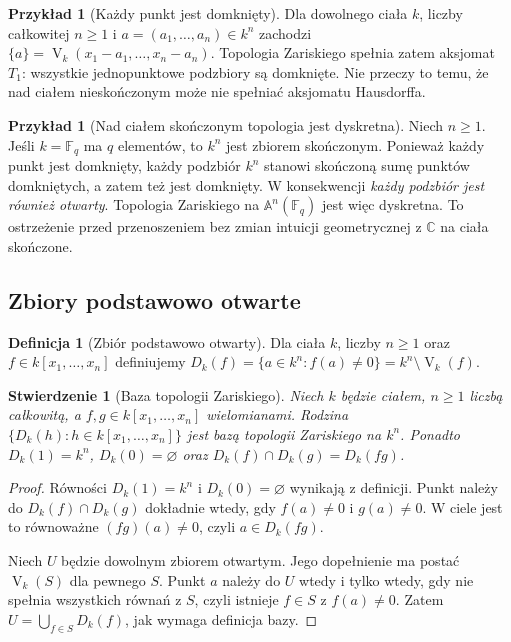 \documentclass[11pt,a4paper,openany]{report}
\numberwithin{equation}{section}
\theoremstyle{plain}
\newtheorem{stwierdzenie}[twierdzenie]{Stwierdzenie}
\theoremstyle{definition}
\newtheorem{definicja}[twierdzenie]{Definicja}
\newtheorem{przyklad}[twierdzenie]{Przykład}
\theoremstyle{remark}
\newcommand{\C}{\mathbb C}
\newcommand{\F}{\mathbb F}
\newcommand{\A}{\mathbb A}
\newcommand{\V}{\operatorname V}
\begin{document}
\begin{przyklad}[Każdy punkt jest domknięty]
Dla dowolnego ciała $k$, liczby całkowitej $n\ge1$
i $a=(a_1,\dots,a_n)\in k^n$
zachodzi $\{a\}=\V_k(x_1-a_1,\dots,x_n-a_n)$.
Topologia Zariskiego spełnia zatem aksjomat $T_1$: wszystkie
jednopunktowe podzbiory są domknięte. Nie przeczy to temu, że
nad ciałem nieskończonym może nie spełniać aksjomatu Hausdorffa.
\end{przyklad}

\begin{przyklad}[Nad ciałem skończonym topologia jest dyskretna]
Niech $n\ge1$. Jeśli $k=\F_q$ ma $q$ elementów, to $k^n$ jest zbiorem skończonym.
Ponieważ każdy punkt jest domknięty, każdy podzbiór $k^n$
stanowi skończoną sumę punktów domkniętych, a zatem też jest domknięty.
W konsekwencji \emph{każdy podzbiór jest również otwarty}.
Topologia Zariskiego na $\A^n(\F_q)$ jest więc dyskretna.
To ostrzeżenie przed przenoszeniem bez zmian intuicji geometrycznej
z $\C$ na ciała skończone.
\end{przyklad}

\subsection{Zbiory podstawowo otwarte}

\begin{definicja}[Zbiór podstawowo otwarty]
Dla ciała $k$, liczby $n\ge1$ oraz $f\in k[x_1,\dots,x_n]$
definiujemy $D_k(f)=\{a\in k^n:f(a)\ne0\}=k^n\setminus\V_k(f)$.
\end{definicja}

\begin{stwierdzenie}[Baza topologii Zariskiego]
Niech $k$ będzie ciałem, $n\ge1$ liczbą całkowitą,
a $f,g\in k[x_1,\dots,x_n]$ wielomianami.
Rodzina $\{D_k(h):h\in k[x_1,\dots,x_n]\}$ jest bazą topologii
Zariskiego na $k^n$. Ponadto $D_k(1)=k^n$, $D_k(0)=\varnothing$
oraz $D_k(f)\cap D_k(g)=D_k(fg)$.
\end{stwierdzenie}
\begin{proof}
Równości $D_k(1)=k^n$ i $D_k(0)=\varnothing$ wynikają z definicji.
Punkt należy do $D_k(f)\cap D_k(g)$ dokładnie wtedy,
gdy $f(a)\ne0$ i $g(a)\ne0$. W ciele jest to równoważne
$(fg)(a)\ne0$, czyli $a\in D_k(fg)$.

Niech $U$ będzie dowolnym zbiorem otwartym.
Jego dopełnienie ma postać $\V_k(S)$ dla pewnego $S$.
Punkt $a$ należy do $U$ wtedy i tylko wtedy, gdy nie spełnia
wszystkich równań z $S$, czyli istnieje $f\in S$ z $f(a)\ne0$.
Zatem $U=\bigcup_{f\in S}D_k(f)$, jak wymaga definicja bazy.
\end{proof}
\end{document}
